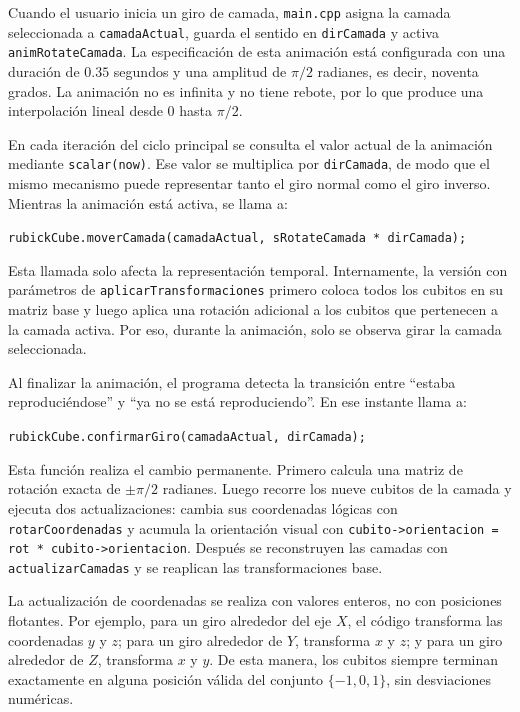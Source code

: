 \documentclass[12pt,a4paper]{article}
\begin{document}
Cuando el usuario inicia un giro de camada, \texttt{main.cpp} asigna la camada seleccionada a \texttt{camadaActual}, guarda el sentido en \texttt{dirCamada} y activa \texttt{animRotateCamada}. La especificación de esta animación está configurada con una duración de $0.35$ segundos y una amplitud de $\pi/2$ radianes, es decir, noventa grados. La animación no es infinita y no tiene rebote, por lo que produce una interpolación lineal desde $0$ hasta $\pi/2$.

En cada iteración del ciclo principal se consulta el valor actual de la animación mediante \texttt{scalar(now)}. Ese valor se multiplica por \texttt{dirCamada}, de modo que el mismo mecanismo puede representar tanto el giro normal como el giro inverso. Mientras la animación está activa, se llama a:

\begin{center}
\texttt{rubickCube.moverCamada(camadaActual, sRotateCamada * dirCamada);}
\end{center}

Esta llamada solo afecta la representación temporal. Internamente, la versión con parámetros de \texttt{aplicarTransformaciones} primero coloca todos los cubitos en su matriz base y luego aplica una rotación adicional a los cubitos que pertenecen a la camada activa. Por eso, durante la animación, solo se observa girar la camada seleccionada.

Al finalizar la animación, el programa detecta la transición entre ``estaba reproduciéndose'' y ``ya no se está reproduciendo''. En ese instante llama a:

\begin{center}
\texttt{rubickCube.confirmarGiro(camadaActual, dirCamada);}
\end{center}

Esta función realiza el cambio permanente. Primero calcula una matriz de rotación exacta de $\pm \pi/2$ radianes. Luego recorre los nueve cubitos de la camada y ejecuta dos actualizaciones: cambia sus coordenadas lógicas con \texttt{rotarCoordenadas} y acumula la orientación visual con \texttt{cubito->orientacion = rot * cubito->orientacion}. Después se reconstruyen las camadas con \texttt{actualizarCamadas} y se reaplican las transformaciones base.

La actualización de coordenadas se realiza con valores enteros, no con posiciones flotantes. Por ejemplo, para un giro alrededor del eje $X$, el código transforma las coordenadas $y$ y $z$; para un giro alrededor de $Y$, transforma $x$ y $z$; y para un giro alrededor de $Z$, transforma $x$ y $y$. De esta manera, los cubitos siempre terminan exactamente en alguna posición válida del conjunto $\{-1,0,1\}$, sin desviaciones numéricas.
\end{document}
